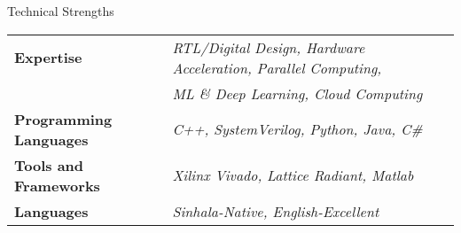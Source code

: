 \documentclass[
	11pt, %
]{./assets/resume} %
\begin{document}
	




\begin{rSection}{Technical Strengths}

	\def\arraystretch{1.5}

	\begin{tabular}{ l l}
		\textbf{Expertise} & \emph{RTL/Digital Design, Hardware Acceleration, Parallel Computing,} \\ 
		& \emph{ML \& Deep Learning, Cloud Computing} \\
		\textbf{Programming Languages} & \emph{C++, SystemVerilog, Python, Java, C\#} \\
		\textbf{Tools and Frameworks} & \emph{Xilinx Vivado, Lattice Radiant, Matlab} \\ 
		\textbf{Languages} & \emph{Sinhala-Native, English-Excellent} \\
	\end{tabular}

\end{rSection}
\end{document}
